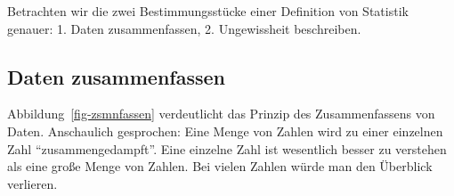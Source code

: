 \documentclass[
  letterpaper,
]{scrbook}
\theoremstyle{definition}
\theoremstyle{definition}
\theoremstyle{definition}
\theoremstyle{remark}
\begin{document}
Betrachten wir die zwei Bestimmungsstücke einer Definition von Statistik
genauer: 1. Daten zusammenfassen, 2. Ungewissheit beschreiben.

\subsection{Daten zusammenfassen}\label{daten-zusammenfassen}

Abbildung~\ref{fig-zsmnfassen} verdeutlicht das Prinzip des
Zusammenfassens von Daten. Anschaulich gesprochen: Eine Menge von Zahlen
wird zu einer einzelnen Zahl \enquote{zusammengedampft}. Eine einzelne
Zahl ist wesentlich besser zu verstehen als eine große Menge von Zahlen.
Bei vielen Zahlen würde man den Überblick verlieren.

\begin{figure}

\begin{minipage}{0.45\linewidth}



\end{minipage}%
%
\begin{minipage}{0.10\linewidth}
~\end{minipage}%
%
\begin{minipage}{0.45\linewidth}

\centering{

}
\end{minipage}
\end{figure}
\end{document}
